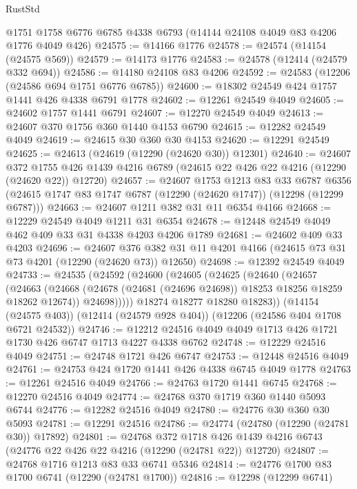 \begin{lexlean}{RustStd}
\begin{coremodule}
    @1751
    @1758
    @6776
    @6785
    @4338
    @6793
    (@14144 @24108 @4049 @83 @4206 @1776 @4049 @426)
@24575 := @14166 @1776
@24578 := @24574 (@14154 (@24575 @569))
@24579 := @14173 @1776
@24583 := @24578 (@12414 (@24579 @332 @694))
@24586 := @14180 @24108 @83 @4206
@24592 := @24583 (@12206 (@24586 @694 @1751 @6776 @6785))
@24600 := @18302 @24549 @424 @1757 @1441 @426 @4338 @6791 @1778
@24602 := @12261 @24549 @4049
@24605 := @24602 @1757 @1441 @6791
@24607 := @12270 @24549 @4049
@24613 := @24607 @370 @1756 @360 @1440 @4153 @6790
@24615 := @12282 @24549 @4049
@24619 := @24615 @30 @360 @30 @4153
@24620 := @12291 @24549
@24625 := @24613 (@24619 (@12290 (@24620 @30)) @12301)
@24640 := @24607
    @372
    @1755
    @426
    @1439
    @4216
    @6789
    (@24615 @22 @426 @22 @4216 (@12290 (@24620 @22)) @12720)
@24657 := @24607
    @1753
    @1213
    @83
    @33
    @6787
    @6356
    (@24615 @1747 @83 @1747 @6787 (@12290 (@24620 @1747)) (@12298 (@12299 @6787)))
@24663 := @24607 @1211 @382 @31 @11 @6354 @4166
@24668 := @12229 @24549 @4049 @1211 @31 @6354
@24678 := @12448 @24549 @4049 @462 @409 @33 @31 @4338 @4203 @4206 @1789
@24681 := @24602 @409 @33 @4203
@24696 := @24607
    @376
    @382
    @31
    @11
    @4201
    @4166
    (@24615 @73 @31 @73 @4201 (@12290 (@24620 @73)) @12650)
@24698 := @12392 @24549 @4049
@24733 := @24535
    (@24592
      (@24600
        (@24605
          (@24625
            (@24640
              (@24657
                (@24663
                  (@24668 (@24678 (@24681 (@24696 @24698)) @18253 @18256 @18259 @18262 @12674))
                  @24698)))))
        @18274
        @18277
        @18280
        @18283))
    (@14154 (@24575 @403))
    (@12414 (@24579 @928 @404))
    (@12206 (@24586 @404 @1708 @6721 @24532))
@24746 := @12212 @24516 @4049 @4049 @1713 @426 @1721 @1730 @426 @6747 @1713 @4227 @4338 @6762
@24748 := @12229 @24516 @4049
@24751 := @24748 @1721 @426 @6747
@24753 := @12448 @24516 @4049
@24761 := @24753 @424 @1720 @1441 @426 @4338 @6745 @4049 @1778
@24763 := @12261 @24516 @4049
@24766 := @24763 @1720 @1441 @6745
@24768 := @12270 @24516 @4049
@24774 := @24768 @370 @1719 @360 @1440 @5093 @6744
@24776 := @12282 @24516 @4049
@24780 := @24776 @30 @360 @30 @5093
@24781 := @12291 @24516
@24786 := @24774 (@24780 (@12290 (@24781 @30)) @17892)
@24801 := @24768
    @372
    @1718
    @426
    @1439
    @4216
    @6743
    (@24776 @22 @426 @22 @4216 (@12290 (@24781 @22)) @12720)
@24807 := @24768 @1716 @1213 @83 @33 @6741 @5346
@24814 := @24776 @1700 @83 @1700 @6741 (@12290 (@24781 @1700))
@24816 := @12298 (@12299 @6741)

\end{coremodule}
\end{lexlean}
